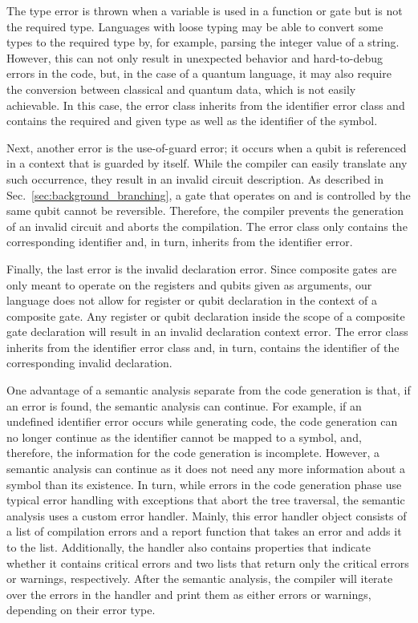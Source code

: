 The type error is thrown when a variable is used in a function or gate but is not the required type. Languages with loose typing may be able to convert some types to the required type by, for example, parsing the integer value of a string. However, this can not only result in unexpected behavior and hard-to-debug errors in the code, but, in the case of a quantum language, it may also require the conversion between classical and quantum data, which is not easily achievable. In this case, the error class inherits from the identifier error class and contains the required and given type as well as the identifier of the symbol.

Next, another error is the use-of-guard error; it occurs when a qubit is referenced in a context that is guarded by itself. While the compiler can easily translate any such occurrence, they result in an invalid circuit description. As described in Sec.~\ref{sec:background_branching}, a gate that operates on and is controlled by the same qubit cannot be reversible. Therefore, the compiler prevents the generation of an invalid circuit and aborts the compilation. The error class only contains the corresponding identifier and, in turn, inherits from the identifier error.

Finally, the last error is the invalid declaration error. Since composite gates are only meant to operate on the registers and qubits given as arguments, our language does not allow for register or qubit declaration in the context of a composite gate. Any register or qubit declaration inside the scope of a composite gate declaration will result in an invalid declaration context error. The error class inherits from the identifier error class and, in turn, contains the identifier of the corresponding invalid declaration. 

One advantage of a semantic analysis separate from the code generation is that, if an error is found, the semantic analysis can continue. For example, if an undefined identifier error occurs while generating code, the code generation can no longer continue as the identifier cannot be mapped to a symbol, and, therefore, the information for the code generation is incomplete. However, a semantic analysis can continue as it does not need any more information about a symbol than its existence. In turn, while errors in the code generation phase use typical error handling with exceptions that abort the tree traversal, the semantic analysis uses a custom error handler. Mainly, this error handler object consists of a list of compilation errors and a report function that takes an error and adds it to the list. Additionally, the handler also contains properties that indicate whether it contains critical errors and two lists that return only the critical errors or warnings, respectively. After the semantic analysis, the compiler will iterate over the errors in the handler and print them as either errors or warnings, depending on their error type.

